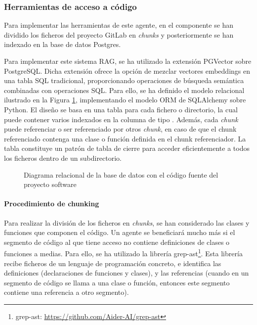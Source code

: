\subsubsection{Herramientas de acceso a código}
Para implementar las herramientas de este agente, en el componente  se han dividido los ficheros del proyecto GitLab en \textit{chunks} y posteriormente se han indexado en la base de datos Postgres.

Para implementar este sistema RAG, se ha utilizado la extensión PGVector sobre PostgreSQL. Dicha extensión ofrece la opción de mezclar vectores embeddings en una tabla SQL tradicional, proporcionando operaciones de búsqueda semántica combinadas con operaciones SQL. Para ello, se ha definido el modelo relacional ilustrado en la Figura \ref{fig:relacional}, implementando el modelo ORM de SQLAlchemy sobre Python. El diseño se basa en una tabla  para cada fichero o directorio, la cual puede contener varios  indexados en la columna  de tipo . Además, cada \textit{chunk} puede referenciar o ser referenciado por otros \textit{chunk}, en caso de que el chunk referenciado contenga una clase o función definida en el chunk referenciador. La tabla  constituye un patrón de tabla de cierre para acceder eficientemente a todos los ficheros dentro de un subdirectorio. 

\begin{figure}[h]
  \centering
  \caption{Diagrama relacional de la base de datos con el código fuente del proyecto software}
  \label{fig:relacional}
\end{figure}

\paragraph{Procedimiento de chunking}
Para realizar la división de los ficheros en \textit{chunks}, se han considerado las clases y funciones que componen el código. Un agente se beneficiará mucho más si el segmento de código al que tiene acceso no contiene definiciones de clases o funciones a medias. Para ello, se ha utilizado la librería grep-ast\footnote{grep-ast: \url{https://github.com/Aider-AI/grep-ast}}. Esta librería recibe ficheros de un lenguaje de programación concreto, e identifica las definiciones (declaraciones de funciones y clases), y las referencias (cuando en un segmento de código se llama a una clase o función, entonces este segmento contiene una referencia a otro segmento). 

